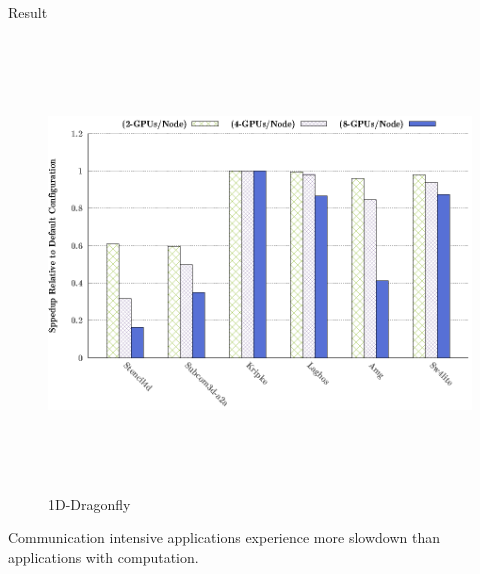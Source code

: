 \documentclass[final]{beamer}
\begin{document}
\begin{frame}[t]
\begin{columns}[t]
\begin{column}{0.5\textwidth}
\begin{block}{Result}
\begin{figure}
\begin{minipage}[t][2cm][t]{.45\textwidth}
\includegraphics[width=1\linewidth,height=12cm]{figs/dfly-x-mapping-all.eps}
\caption{1D-Dragonfly}
\label{fig:13b}
\end{minipage}
\end{figure}
Communication intensive applications experience more slowdown than applications with computation.
 \vspace{-1cm}


\end{block}
\end{column}
\end{columns}
\end{frame}
\end{document}
